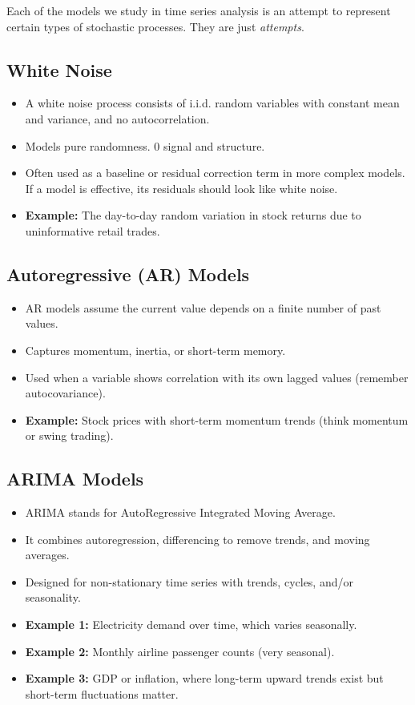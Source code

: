 \documentclass[10pt]{article}
\begin{document}
Each of the models we study in time series analysis is an attempt to represent certain types of stochastic processes. They are just \emph{attempts}.

\subsection*{White Noise}
\begin{itemize}
	\item A white noise process consists of i.i.d. random variables with constant mean and variance, and no autocorrelation.
	\item Models pure randomness. 0 signal and structure.
	\item Often used as a baseline or residual correction term in more complex models. If a model is effective, its residuals should look like white noise.
	\item \textbf{Example:} The day-to-day random variation in stock returns due to uninformative retail trades.
\end{itemize}

\subsection*{Autoregressive (AR) Models}
\begin{itemize}
	\item AR models assume the current value depends on a finite number of past values.
	\item Captures momentum, inertia, or short-term memory.
	\item Used when a variable shows correlation with its own lagged values (remember autocovariance).
	\item \textbf{Example:} Stock prices with short-term momentum trends (think momentum or swing trading).
\end{itemize}

\subsection*{ARIMA Models}
\begin{itemize}
	\item ARIMA stands for AutoRegressive Integrated Moving Average.
	\item It combines autoregression, differencing to remove trends, and moving averages.
	\item Designed for non-stationary time series with trends, cycles, and/or seasonality.
	\item \textbf{Example 1:} Electricity demand over time, which varies seasonally.
	\item \textbf{Example 2:} Monthly airline passenger counts (very seasonal).
	\item \textbf{Example 3:} GDP or inflation, where long-term upward trends exist but short-term fluctuations matter.
\end{itemize}
\end{document}
